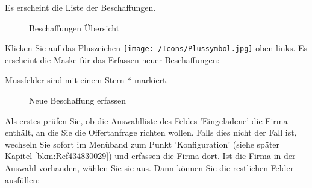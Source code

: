 Es erscheint die Liste der Beschaffungen.

\vspace{2cm}

\begin{figure}[H]
\caption{Beschaffungen Übersicht}
\end{figure}


Klicken Sie auf das Pluszeichen \texttt{[image: /Icons/Plussymbol.jpg]}  oben links. Es erscheint die Maske für das Erfassen neuer Beschaffungen:

\vspace{\baselineskip}

Mussfelder sind mit einem Stern * markiert.

\begin{figure}[H]
\caption{Neue Beschaffung erfassen}
\end{figure}

Als erstes prüfen Sie, ob die Auswahlliste des Feldes 'Eingeladene'  die Firma enthält, an die Sie die Offertanfrage richten wollen. Falls dies nicht der Fall ist, wechseln Sie sofort im Menüband zum Punkt 'Konfiguration' (siehe später Kapitel \ref{bkm:Ref434830029}) und erfassen die Firma dort. Ist die Firma in der Auswahl vorhanden, wählen Sie sie aus. Dann können Sie die restlichen Felder ausfüllen:

\vspace{\baselineskip}

